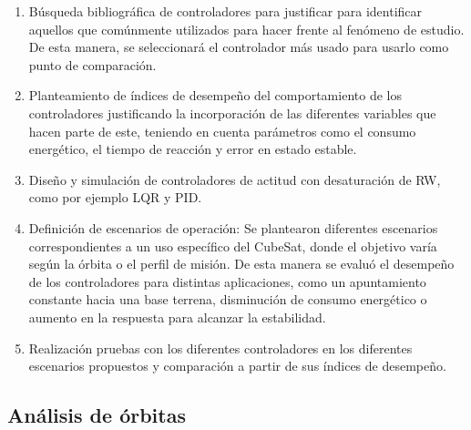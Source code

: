 \begin{enumerate}[label=\alph*)]
	
	\item	Búsqueda bibliográfica de controladores para justificar para identificar aquellos que comúnmente utilizados para hacer frente al fenómeno de estudio. De esta manera, se seleccionará el controlador más usado para usarlo como punto de comparación. 
	\item	Planteamiento de índices de desempeño del comportamiento de los controladores justificando la incorporación de las diferentes variables que hacen parte de este, teniendo en cuenta parámetros como el consumo energético, el tiempo de reacción y error en estado estable.
	\item	Diseño y simulación de controladores de actitud con desaturación de RW, como por ejemplo LQR y PID.
	\item	Definición de escenarios de operación: Se plantearon diferentes escenarios correspondientes a un uso específico del CubeSat, donde el objetivo varía según la órbita o el perfil de misión. De esta manera se evaluó el desempeño de los controladores para distintas aplicaciones, como un apuntamiento constante hacia una base terrena, disminución de consumo energético o aumento en la respuesta para alcanzar la estabilidad.
	\item	Realización pruebas con los diferentes controladores en los diferentes escenarios propuestos y comparación a partir de sus índices de desempeño.
	
	
\end{enumerate}
 
 \subsection{Análisis de órbitas} 

